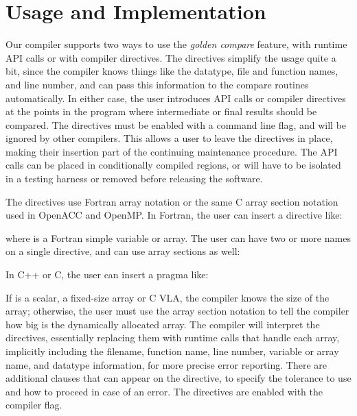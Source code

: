 \section{Usage and Implementation}

Our compiler supports two ways to use the \emph{golden compare} feature, with runtime API calls or with compiler directives.
The directives simplify the usage quite a bit, since the compiler knows things like the datatype, file and function names, and line number, and can pass this information to the compare routines automatically.
In either case, the user introduces API calls or compiler directives at the points in the program where intermediate or final results should be compared.
The directives must be enabled with a command line flag, and will be ignored by other compilers.
This allows a user to leave the directives in place, making their insertion part of the continuing maintenance procedure.
The API calls can be placed in conditionally compiled regions, or will have to be isolated in a testing harness or removed before releasing the software.

The directives use Fortran array notation or the same C array section notation used in OpenACC and OpenMP.
In Fortran, the user can insert a directive like:
\begin{otabbing}
\>
\end{otabbing}
where  is a Fortran simple variable or array.
The user can have two or more names on a single directive, and can use array sections as well:
\begin{otabbing}
\>
\end{otabbing}
In C++ or C, the user can insert a pragma like:
\begin{otabbing}
\>
\end{otabbing}
If  is a scalar, a fixed-size array or C VLA, the compiler knows the size of the array; otherwise, the user must use the array section notation to tell the compiler how big is the dynamically allocated array.
The compiler will interpret the directives, essentially replacing them with runtime calls that handle each array, implicitly including the filename, function name, line number, variable or array name, and datatype information, for more precise error reporting.
There are additional clauses that can appear on the directive, to specify the tolerance to use and how to proceed in case of an error.
The directives are enabled with the  compiler flag.

